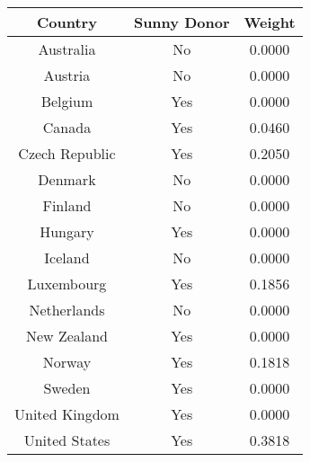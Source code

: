 \begin{tabular}{c|c|c}
\textbf{Country}&\textbf{Sunny Donor}&\textbf{Weight}\\
\hline 
Australia & No & 0.0000 \\ 
Austria & No & 0.0000 \\ 
Belgium & Yes & 0.0000 \\ 
Canada & Yes & 0.0460 \\ 
Czech Republic & Yes & 0.2050 \\ 
Denmark & No & 0.0000 \\ 
Finland & No & 0.0000 \\ 
Hungary & Yes & 0.0000 \\ 
Iceland & No & 0.0000 \\ 
Luxembourg & Yes & 0.1856 \\ 
Netherlands & No & 0.0000 \\ 
New Zealand & Yes & 0.0000 \\ 
Norway & Yes & 0.1818 \\ 
Sweden & Yes & 0.0000 \\ 
United Kingdom & Yes & 0.0000 \\ 
United States & Yes & 0.3818 \\ 
\end{tabular}